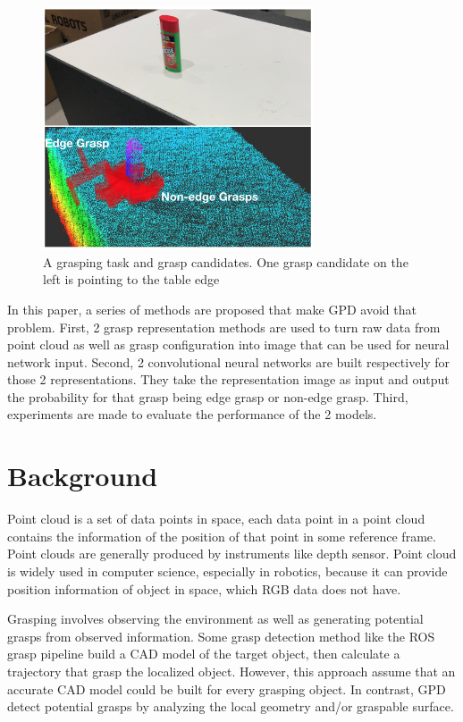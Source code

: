 \documentclass[letterpaper]{article} %
\begin{document}
\begin{figure}
    \centering
    \includegraphics[width=8cm]{images/edgegraspexample.png}
    \caption{A grasping task and grasp candidates. One grasp candidate on the left is pointing to the table edge}
    \label{fig:my_label}
\end{figure}

In this paper, a series of methods are proposed that make GPD avoid that problem. First, 2 grasp representation methods are used to turn raw data from point cloud as well as grasp configuration into image that can be used for neural network input. Second, 2 convolutional neural networks are built respectively for those 2 representations. They take the representation image as input and output the probability for that grasp being edge grasp or non-edge grasp. Third, experiments are made to evaluate the performance of the 2 models.

\section{Background}

Point cloud is a set of data points in space, each data point in a point cloud contains the information of the position of that point in some reference frame. Point clouds are generally produced by instruments like depth sensor. Point cloud is widely used in computer science, especially in robotics, because it can provide position information of object in space, which RGB data does not have. 

Grasping involves observing the environment as well as generating potential grasps from observed information. Some grasp detection method like the ROS grasp pipeline \cite{RN5} build a CAD model of the target object, then calculate a trajectory that grasp the localized object. However, this approach assume that an accurate CAD model could be built for every grasping object. In contrast, GPD \cite{RN6} detect potential grasps by analyzing the local geometry and/or graspable surface.
\end{document}
